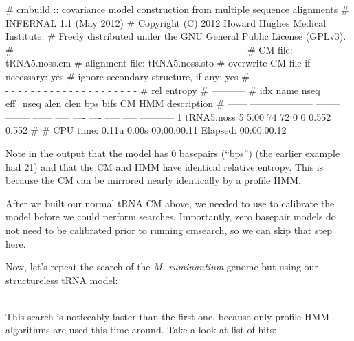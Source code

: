 \begin{sreoutput}
# cmbuild :: covariance model construction from multiple sequence alignments
# INFERNAL 1.1 (May 2012)
# Copyright (C) 2012 Howard Hughes Medical Institute.
# Freely distributed under the GNU General Public License (GPLv3).
# - - - - - - - - - - - - - - - - - - - - - - - - - - - - - - - - - - - -
# CM file:                                            tRNA5.noss.cm
# alignment file:                                     tRNA5.noss.sto
# overwrite CM file if necessary:                     yes
# ignore secondary structure, if any:                 yes
# - - - - - - - - - - - - - - - - - - - - - - - - - - - - - - - - - - - -
#                                                                      rel entropy
#                                                                      -----------
# idx    name                     nseq eff_nseq   alen  clen  bps bifs    CM   HMM description
# ------ -------------------- -------- -------- ------ ----- ---- ---- ----- ----- -----------
       1 tRNA5.noss                  5     5.00     74    72    0    0 0.552 0.552 
#
# CPU time: 0.11u 0.00s 00:00:00.11 Elapsed: 00:00:00.12
\end{sreoutput}

Note in the output that the model has 0 basepairs (``bps'') (the
earlier example had 21) and that the CM and HMM have identical
relative entropy. This is because the CM can be mirrored nearly
identically by a profile HMM.

After we built our normal tRNA CM above, we needed to use  to
calibrate the model before we could perform searches. Importantly,
zero basepair models do not need to be calibrated prior to running
cmsearch, so we can skip that step here. 

Now, let's repeat the search of the \emph{M. ruminantium} genome but
using our structureless tRNA model: 

\\

This search is noticeably faster than the first one, because only
profile HMM algorithms are used this time around. Take a look at list
of hits:


